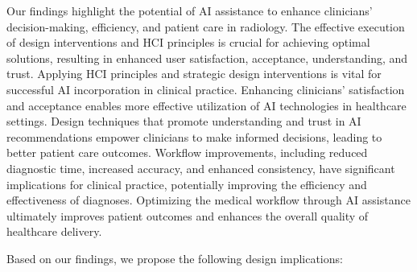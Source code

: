 Our findings highlight the potential of \ac{AI} assistance to enhance clinicians' decision-making, efficiency, and patient care in radiology.
The effective execution of design interventions and \ac{HCI} principles is crucial for achieving optimal solutions, resulting in enhanced user satisfaction, acceptance, understanding, and trust.
Applying \ac{HCI} principles and strategic design interventions is vital for successful \ac{AI} incorporation in clinical practice.
Enhancing clinicians' satisfaction and acceptance enables more effective utilization of \ac{AI} technologies in healthcare settings.
Design techniques that promote understanding and trust in \ac{AI} recommendations empower clinicians to make informed decisions, leading to better patient care outcomes.
Workflow improvements, including reduced diagnostic time, increased accuracy, and enhanced consistency, have significant implications for clinical practice, potentially improving the efficiency and effectiveness of diagnoses.
Optimizing the medical workflow through \ac{AI} assistance ultimately improves patient outcomes and enhances the overall quality of healthcare delivery.

\vspace{1.00mm}

\noindent
Based on our findings, we propose the following design implications:

\vspace{0.05mm}


